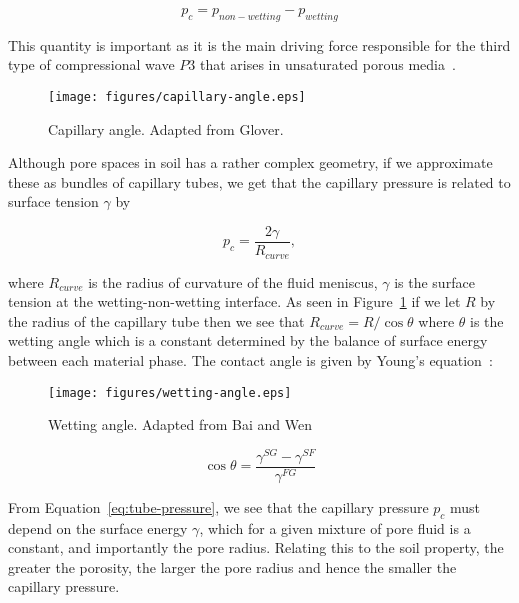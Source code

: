 \documentclass[twocolumn]{article}
\begin{document}
\begin{equation} \label{eq:capillary-def}
    p_c= p_{non-wetting} - p_{wetting}
\end{equation}

This quantity is important as it is the main driving force responsible for the third type of compressional wave $P3$ that arises in unsaturated porous media~\cite{detmann_num_sim_2008}.

\begin{figure}
    \centering
    \texttt{[image: figures/capillary-angle.eps]}
    \caption{Capillary angle. Adapted from Glover.~\cite{glover_2014}}
    \label{fig:capillary-angle}
\end{figure}

Although pore spaces in soil has a rather complex geometry, if we approximate these as bundles of capillary tubes, we get that the capillary pressure is related to surface tension $\gamma$ by

\begin{equation}    \label{eq:tube-pressure}
    p_c = \frac{2\gamma}{R_{curve}},
\end{equation}

where $R_{curve}$ is the radius of curvature of the fluid meniscus, $\gamma$ is the surface tension at the wetting-non-wetting interface. As seen in Figure~\ref{fig:capillary-angle} if we let $R$ by the radius of the capillary tube then we see that $R_{curve} = R / \cos\theta$ where $\theta$ is the wetting angle which is a constant determined by the balance of surface energy between each material phase. The contact angle is given by Young’s equation~\cite{bai_wen_2019}:

\begin{figure}
    \centering
    \texttt{[image: figures/wetting-angle.eps]}
    \caption{Wetting angle. Adapted from Bai and Wen~\cite{bai_wen_2019}}
    \label{fig:wetting-angle}
\end{figure}

\begin{equation}
    \cos\theta = \frac{\gamma^{SG} - \gamma^{SF}}{\gamma^{FG}}
\end{equation}

From Equation~\ref{eq:tube-pressure}, we see that the capillary pressure $p_c$ must depend on the surface energy $\gamma$, which for a given mixture of pore fluid is a constant, and importantly the pore radius. Relating this to the soil property, the greater the porosity, the larger the pore radius and hence the smaller the capillary pressure.
\end{document}
